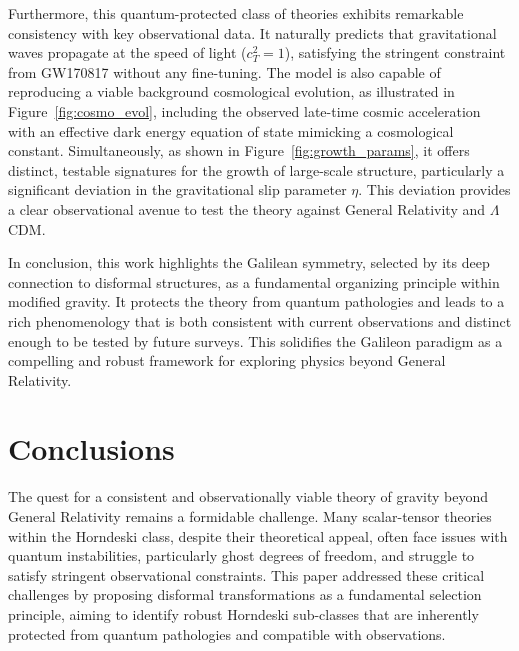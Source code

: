 \documentclass[twocolumn]{aastex631}
\begin{document}
Furthermore, this quantum-protected class of theories exhibits remarkable consistency with key observational data. It naturally predicts that gravitational waves propagate at the speed of light ($c_T^2=1$), satisfying the stringent constraint from GW170817 without any fine-tuning. The model is also capable of reproducing a viable background cosmological evolution, as illustrated in \mbox{Figure \ref{fig:cosmo_evol}}, including the observed late-time cosmic acceleration with an effective dark energy equation of state mimicking a cosmological constant. Simultaneously, as shown in \mbox{Figure \ref{fig:growth_params}}, it offers distinct, testable signatures for the growth of large-scale structure, particularly a significant deviation in the gravitational slip parameter $\eta$. This deviation provides a clear observational avenue to test the theory against General Relativity and $\Lambda$CDM.

In conclusion, this work highlights the Galilean symmetry, selected by its deep connection to disformal structures, as a fundamental organizing principle within modified gravity. It protects the theory from quantum pathologies and leads to a rich phenomenology that is both consistent with current observations and distinct enough to be tested by future surveys. This solidifies the Galileon paradigm as a compelling and robust framework for exploring physics beyond General Relativity.

\section{Conclusions}
\label{sec:conclusions}
The quest for a consistent and observationally viable theory of gravity beyond General Relativity remains a formidable challenge. Many scalar-tensor theories within the Horndeski class, despite their theoretical appeal, often face issues with quantum instabilities, particularly ghost degrees of freedom, and struggle to satisfy stringent observational constraints. This paper addressed these critical challenges by proposing disformal transformations as a fundamental selection principle, aiming to identify robust Horndeski sub-classes that are inherently protected from quantum pathologies and compatible with observations.
\end{document}
